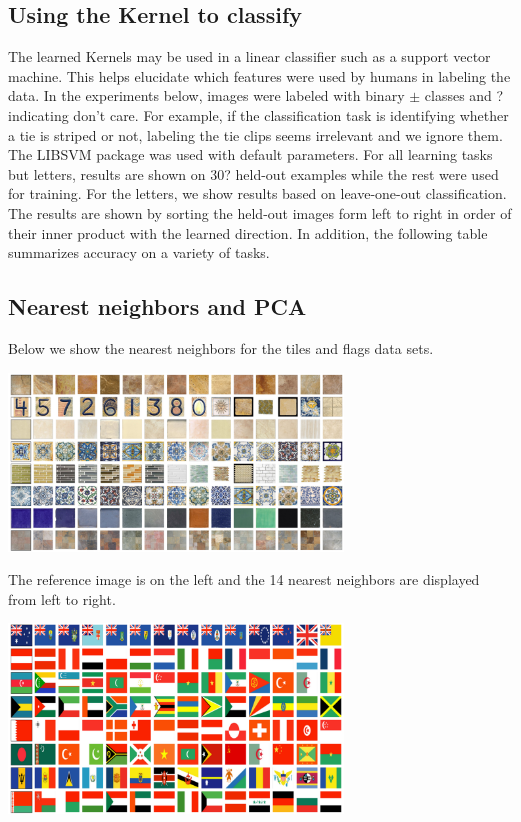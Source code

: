 \documentclass{article}
\begin{document}
\subsection{Using the Kernel to classify}

The learned Kernels may be used in a linear classifier such as a support vector machine.  This helps elucidate which features were used by humans in labeling the data.  In the experiments below, images were labeled with binary $\pm$ classes and ? indicating don't care.  For example, if the classification task is identifying whether a tie is striped or not, labeling the tie clips seems irrelevant and we ignore them.  The LIBSVM \cite{CC01} package was used with default parameters.  For all learning tasks but letters, results are shown on 30? held-out examples while the rest were used for training.  For the letters, we show results based on leave-one-out classification.  The results are shown by sorting the held-out images form left to right in order of their inner product with the learned direction.  In addition, the following table summarizes accuracy on a variety of tasks.

\subsection{Nearest neighbors and PCA}
Below we show the nearest neighbors for the tiles and flags data sets.

{\center \includegraphics[width=3.5in]{tiles_neighs.pdf}} 

The reference image is on the left and the 14 nearest neighbors are displayed from left to right.

{\center \includegraphics[width=3.5in]{flags_neighs.pdf}}
\end{document}
